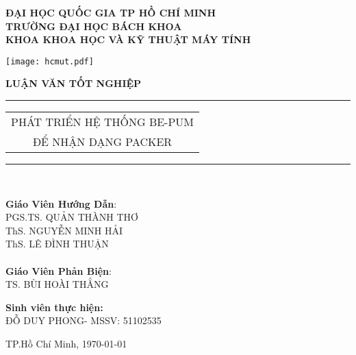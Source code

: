 \begin{titlepage}


\vspace{-1cm}

\thispagestyle{empty}
\begin{center}
	\bfseries ĐẠI HỌC QUỐC GIA TP HỒ CHÍ MINH \\
	TRƯỜNG ĐẠI HỌC BÁCH KHOA \\
	KHOA KHOA HỌC VÀ KỸ THUẬT MÁY TÍNH\\
\end{center}

\vspace{0.5cm}

\begin{center}
\texttt{[image: hcmut.pdf]}\\[1cm]
\end{center}

\begin{center}
	\Large \bfseries LUẬN VĂN TỐT NGHIỆP \\[0.5cm]
\end{center}
\rule{\textwidth}{1pt}
\begin{center}
\Huge
	\begin{tabular}{@{}c}
		PHÁT TRIỂN HỆ THỐNG BE-PUM \\ 
		ĐỂ NHẬN DẠNG PACKER \\ [6pt]
	\end{tabular}
\end{center}
\rule{\textwidth}{1pt}\\[1cm]

\hspace{-0.5cm}
\begin{minipage}[t]{0.44\linewidth}
	\textbf{Giáo Viên Hướng Dẫn}: \\
		PGS.TS. QUẢN THÀNH THƠ\\
		ThS. NGUYỄN MINH HẢI\\
		ThS. LÊ ĐÌNH THUẬN\\\\
	\textbf{Giáo Viên Phản Biện}: \\
		 TS. BÙI HOÀI THẮNG
	\end{minipage}
\begin{minipage}[t]{0.60\linewidth}
	\textbf{Sinh viên thực hiện:}\\
		ĐỖ DUY PHONG- MSSV: 51102535
\end{minipage}

\vspace{1.4cm}

\vfill
\begin{center}
	{TP.Hồ Chí Minh, \today}
\end{center}
\end{titlepage}

